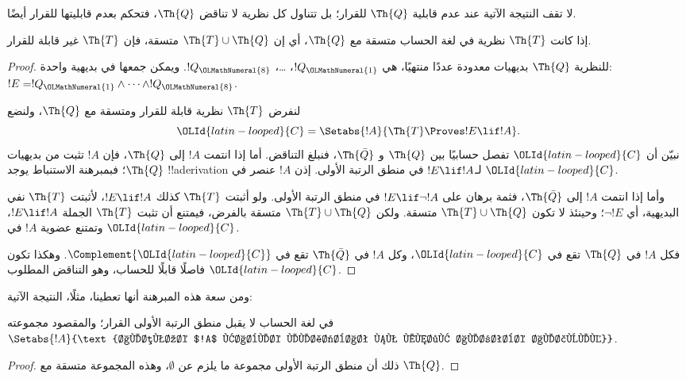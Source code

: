 \documentclass[../../../include/open-logic-section]{subfiles}
\begin{document}


لا تقف النتيجة الآتية عند عدم قابلية $\Th{Q}$ للقرار؛ بل تتناول
كل نظرية لا تناقض $\Th{Q}$، فتحكم بعدم قابليتها للقرار أيضًا.

\begin{thm}
إذا كانت $\Th{T}$ نظرية في لغة الحساب متسقة مع $\Th{Q}$، أي إن
$\Th{T}\cup\Th{Q}$ متسقة، فإن $\Th{T}$ غير قابلة للقرار.
\end{thm}

\begin{proof}
للنظرية $\Th{Q}$ بديهيات معدودة عددًا منتهيًا، هي $!Q_\OLMathNumeral{1}$، \dots،
$!Q_\OLMathNumeral{8}$. ويمكن جمعها في بديهية واحدة:
$!E=!Q_\OLMathNumeral{1}\land\dots\land !Q_\OLMathNumeral{8}$.

لنفرض $\Th{T}$ نظرية قابلة للقرار ومتسقة مع $\Th{Q}$، ولنضع
\[
\OLId{latin-looped}{C}=\Setabs{!A}{\Th{T}\Proves !E\lif !A}.
\]
نبيّن أن $\OLId{latin-looped}{C}$ تفصل حسابيًا بين $\Th{Q}$ و
$\Th{\bar Q}$، فنبلغ التناقض. أما إذا انتمت $!A$ إلى $\Th{Q}$،
فإن $!A$ تثبت من بديهيات $\Th{Q}$؛ فبمبرهنة الاستنباط يوجد
!!a{derivation} لـ$!E\lif !A$ في منطق الرتبة الأولى.
إذن $!A$ عنصر في $\OLId{latin-looped}{C}$.

وأما إذا انتمت $!A$ إلى $\Th{\bar Q}$، فثمة برهان على
$!E\lif\lnot !A$ في منطق الرتبة الأولى. ولو أثبتت $\Th{T}$
كذلك $!E\lif !A$، لأثبتت $\Th{T}$ نفي البديهية، أي $\lnot !E$؛
وحينئذ لا تكون $\Th{T}\cup\Th{Q}$ متسقة. ولكن
$\Th{T}\cup\Th{Q}$ متسقة بالفرض، فيمتنع أن تثبت $\Th{T}$
الجملة $!E\lif !A$، وتمتنع عضوية $!A$ في $\OLId{latin-looped}{C}$.

فكل $!A$ في $\Th{Q}$ تقع في $\OLId{latin-looped}{C}$،
وكل $!A$ في $\Th{\bar Q}$ تقع في $\Complement{\OLId{latin-looped}{C}}$.
وهكذا تكون $\OLId{latin-looped}{C}$ فاصلًا قابلًا للحساب، وهو التناقض المطلوب.
\end{proof}

ومن سعة هذه المبرهنة أنها تعطينا، مثلًا، النتيجة الآتية:

\begin{cor}
  في لغة الحساب لا يقبل منطق الرتبة الأولى القرار؛ والمقصود مجموعته
  $\Setabs{!A}{\text{الصيغة $!A$ قابلة للإثبات في منطق الرتبة الأولى}}$.
\end{cor}

\begin{proof}
ذلك أن منطق الرتبة الأولى مجموعة ما يلزم عن $\emptyset$،
وهذه المجموعة متسقة مع $\Th{Q}$.
\end{proof}
\end{document}
